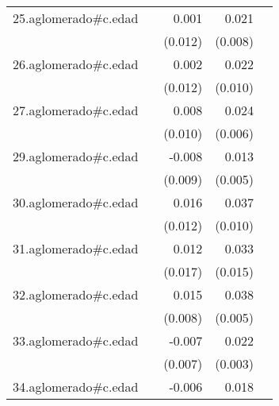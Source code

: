 {\begin{longtable}{l*{4}{D{.}{.}{-1}}}
\addlinespace
25.aglomerado#c.edad&                     &       0.001         &       0.021\sym{*}  &                     \\
            &                     &     (0.012)         &     (0.008)         &                     \\
\addlinespace
26.aglomerado#c.edad&                     &       0.002         &       0.022\sym{*}  &                     \\
            &                     &     (0.012)         &     (0.010)         &                     \\
\addlinespace
27.aglomerado#c.edad&                     &       0.008         &       0.024\sym{***}&                     \\
            &                     &     (0.010)         &     (0.006)         &                     \\
\addlinespace
29.aglomerado#c.edad&                     &      -0.008         &       0.013\sym{**} &                     \\
            &                     &     (0.009)         &     (0.005)         &                     \\
\addlinespace
30.aglomerado#c.edad&                     &       0.016         &       0.037\sym{***}&                     \\
            &                     &     (0.012)         &     (0.010)         &                     \\
\addlinespace
31.aglomerado#c.edad&                     &       0.012         &       0.033\sym{*}  &                     \\
            &                     &     (0.017)         &     (0.015)         &                     \\
\addlinespace
32.aglomerado#c.edad&                     &       0.015         &       0.038\sym{***}&                     \\
            &                     &     (0.008)         &     (0.005)         &                     \\
\addlinespace
33.aglomerado#c.edad&                     &      -0.007         &       0.022\sym{***}&                     \\
            &                     &     (0.007)         &     (0.003)         &                     \\
\addlinespace
34.aglomerado#c.edad&                     &      -0.006         &       0.018\sym{**} &                     \\

\end{longtable}}
